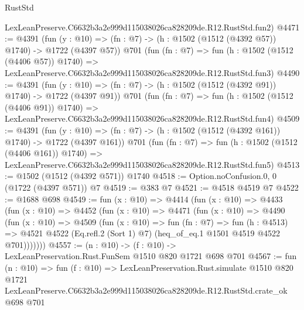 \begin{lexlean}{RustStd}
\begin{coremodule}
    LexLeanPreserve.C6632b3a2e999d115038026ca828209de.R12.RustStd.fun2)
@4471 := @4391
    (fun (y : @10) => (fn : @7) -> (h : @1502 (@1512 (@4392 @57)) @1740) -> @1722 (@4397 @57))
    @701
    (fun (fn : @7) =>
    fun (h : @1502 (@1512 (@4406 @57)) @1740) =>
    LexLeanPreserve.C6632b3a2e999d115038026ca828209de.R12.RustStd.fun3)
@4490 := @4391
    (fun (y : @10) => (fn : @7) -> (h : @1502 (@1512 (@4392 @91)) @1740) -> @1722 (@4397 @91))
    @701
    (fun (fn : @7) =>
    fun (h : @1502 (@1512 (@4406 @91)) @1740) =>
    LexLeanPreserve.C6632b3a2e999d115038026ca828209de.R12.RustStd.fun4)
@4509 := @4391
    (fun (y : @10) => (fn : @7) -> (h : @1502 (@1512 (@4392 @161)) @1740) -> @1722 (@4397 @161))
    @701
    (fun (fn : @7) =>
    fun (h : @1502 (@1512 (@4406 @161)) @1740) =>
    LexLeanPreserve.C6632b3a2e999d115038026ca828209de.R12.RustStd.fun5)
@4513 := @1502 (@1512 (@4392 @571)) @1740
@4518 := Option.noConfusion.{0, 0} (@1722 (@4397 @571)) @7
@4519 := @383 @7
@4521 := @4518 @4519 @7
@4522 := @1688 @698
@4549 := fun (x : @10) =>
  @4414
    (fun (x : @10) =>
    @4433
      (fun (x : @10) =>
      @4452
        (fun (x : @10) =>
        @4471
          (fun (x : @10) =>
          @4490
            (fun (x : @10) =>
            @4509
              (fun (x : @10) =>
              fun (fn : @7) =>
              fun (h : @4513) =>
              @4521 @4522 (Eq.refl.{2} (Sort 1) @7) (heq_of_eq.{1} @1501 @4519 @4522 @701)))))))
@4557 := (n : @10) -> (f : @10) -> LexLeanPreservation.Rust.FunSem @1510 @820 @1721 @698 @701
@4567 := fun (n : @10) =>
  fun (f : @10) =>
  LexLeanPreservation.Rust.simulate
    @1510
    @820
    @1721
    LexLeanPreserve.C6632b3a2e999d115038026ca828209de.R12.RustStd.crate_ok
    @698
    @701
\end{coremodule}
\end{lexlean}
